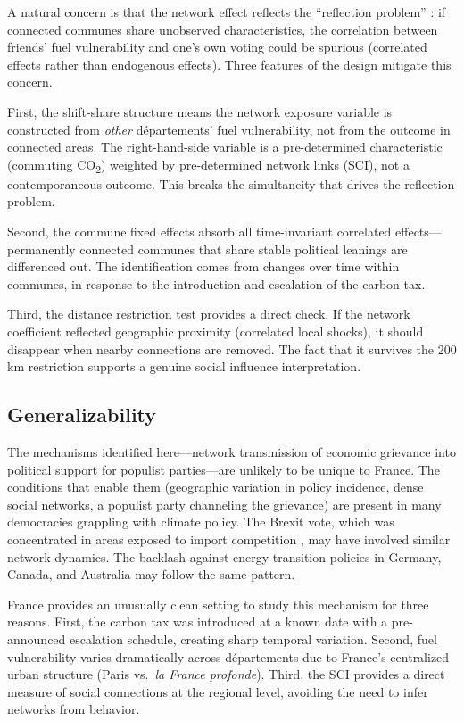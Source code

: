 \documentclass[12pt]{article}
\newcommand{\depts}{d\'{e}partements}
\begin{document}
A natural concern is that the network effect reflects the ``reflection problem'' \citep{manski1993identification}: if connected communes share unobserved characteristics, the correlation between friends' fuel vulnerability and one's own voting could be spurious (correlated effects rather than endogenous effects). Three features of the design mitigate this concern.

First, the shift-share structure means the network exposure variable is constructed from \emph{other} \depts{}' fuel vulnerability, not from the outcome in connected areas. The right-hand-side variable is a pre-determined characteristic (commuting CO\textsubscript{2}) weighted by pre-determined network links (SCI), not a contemporaneous outcome. This breaks the simultaneity that drives the reflection problem.

Second, the commune fixed effects absorb all time-invariant correlated effects---permanently connected communes that share stable political leanings are differenced out. The identification comes from changes over time within communes, in response to the introduction and escalation of the carbon tax.

Third, the distance restriction test provides a direct check. If the network coefficient reflected geographic proximity (correlated local shocks), it should disappear when nearby connections are removed. The fact that it survives the 200 km restriction supports a genuine social influence interpretation.

\subsection{Generalizability}

The mechanisms identified here---network transmission of economic grievance into political support for populist parties---are unlikely to be unique to France. The conditions that enable them (geographic variation in policy incidence, dense social networks, a populist party channeling the grievance) are present in many democracies grappling with climate policy. The Brexit vote, which was concentrated in areas exposed to import competition \citep{colantone2018trade, fetzer2019did}, may have involved similar network dynamics. The backlash against energy transition policies in Germany, Canada, and Australia may follow the same pattern.

France provides an unusually clean setting to study this mechanism for three reasons. First, the carbon tax was introduced at a known date with a pre-announced escalation schedule, creating sharp temporal variation. Second, fuel vulnerability varies dramatically across \depts{} due to France's centralized urban structure (Paris vs.\ \textit{la France profonde}). Third, the SCI provides a direct measure of social connections at the regional level, avoiding the need to infer networks from behavior.
\end{document}
